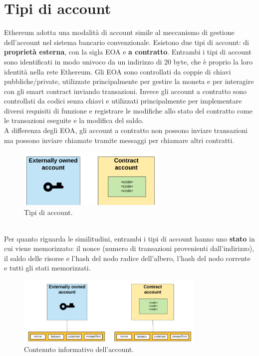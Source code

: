 \documentclass[a4paper,11pt]{report}
\begin{document}
\section{Tipi di account}
Ethereum adotta una modalità di account simile al meccanismo di gestione dell'account nel sistema bancario convenzionale. Esistono due tipi di account: di \textbf{proprietà esterna}, con la sigla EOA e \textbf{a contratto}. Entrambi i tipi di account sono identificati in modo univoco da un indirizzo di 20 byte, che è proprio la loro identità nella rete Ethereum. Gli EOA sono controllati da coppie di chiavi pubbliche/private, utilizzate principalmente per gestire la moneta e per interagire con gli smart contract inviando transazioni. Invece gli account a contratto sono controllati da codici senza chiavi e utilizzati principalmente per implementare diversi requisiti di funzione e registrare le modifiche allo stato del contratto come le transazioni eseguite e la modifica del saldo.\\
A differenza degli EOA, gli account a contratto non possono inviare transazioni ma possono inviare chiamate tramite messaggi per chiamare altri contratti.\\
\begin{figure}[htbp] 
\begin{center}
\includegraphics[width=7cm]{img/ac.png} 
\end{center}
\caption{Tipi di account. \cite{genesis}}
\end{figure}
\\Per quanto riguarda le similitudini, entrambi i tipi di account hanno uno \textbf{stato} in cui viene memorizzato: il nonce (numero di transazioni provenienti dall'indirizzo), il saldo delle risorse e l'hash del nodo radice dell'albero, l'hash del nodo corrente e tutti gli stati memorizzati. \\
\begin{figure}[htbp] 
\begin{center}
\includegraphics[width=9cm]{img/ndi.png} 
\end{center}
\caption{Contenuto informativo dell'account. \cite{genesis}}
\end{figure}
\end{document}
